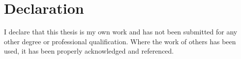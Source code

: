 \chapter*{Declaration}

I declare that this thesis is my own work and has not been submitted for any other degree or professional qualification. Where the work of others has been used, it has been properly acknowledged and referenced.

\vspace{2cm}
\\
[DATE]
